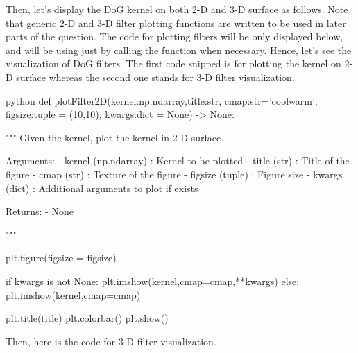 \documentclass[12pt]{amsart}
\begin{document}
Then, let's display the DoG kernel on both 2-D and 3-D surface as follows. Note that generic 2-D and 3-D filter plotting functions are written to be used in later parts of the question. The code for plotting filters will be only displayed below, and will be using just by calling the function when necessary. Hence, let's see the visualization of DoG filters. The first code snipped is for plotting the kernel on 2-D surface whereas the second one stands for 3-D filter visualization. 

\begin{mintedbox}{python}
def plotFilter2D(kernel:np.ndarray,title:str,
                 cmap:str='coolwarm',
                 figsize:tuple = (10,10),
                 kwargs:dict = None) -> None:

    """
        Given the kernel, plot the kernel in 2-D surface.

            Arguments:
                - kernel (np.ndarray) : Kernel to be plotted
                - title  (str)        : Title of the figure
                - cmap   (str)        : Texture of the figure
                - figsize (tuple)     : Figure size
                - kwargs (dict)       : Additional arguments to plot if exists

            Returns:
                - None

    """

    plt.figure(figsize = figsize)

    if kwargs is not None:
        plt.imshow(kernel,cmap=cmap,**kwargs)
    else:
        plt.imshow(kernel,cmap=cmap)       
    
    plt.title(title)
    plt.colorbar()
    plt.show()
\end{mintedbox}

Then, here is the code for 3-D filter visualization.
\end{document}
